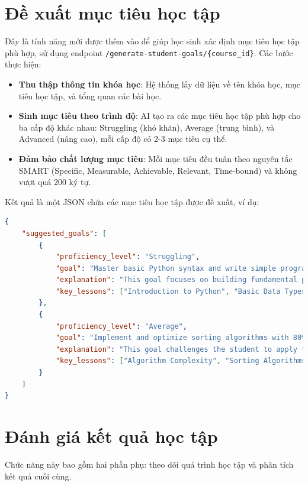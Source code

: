 \section{Đề xuất mục tiêu học tập}
Đây là tính năng mới được thêm vào để giúp học sinh xác định mục tiêu học tập phù hợp, sử dụng endpoint \texttt{/generate-student-goals/\{course\_id\}}. Các bước thực hiện:

\begin{itemize}
    \item \textbf{Thu thập thông tin khóa học}: Hệ thống lấy dữ liệu về tên khóa học, mục tiêu học tập, và tổng quan các bài học.
    \item \textbf{Sinh mục tiêu theo trình độ}: AI tạo ra các mục tiêu học tập phù hợp cho ba cấp độ khác nhau: Struggling (khó khăn), Average (trung bình), và Advanced (nâng cao), mỗi cấp độ có 2-3 mục tiêu cụ thể.
    \item \textbf{Đảm bảo chất lượng mục tiêu}: Mỗi mục tiêu đều tuân theo nguyên tắc SMART (Specific, Measurable, Achievable, Relevant, Time-bound) và không vượt quá 200 ký tự.
\end{itemize}

Kết quả là một JSON chứa các mục tiêu học tập được đề xuất, ví dụ:
\begin{lstlisting}[language=JSON]
{
    "suggested_goals": [
        {
            "proficiency_level": "Struggling",
            "goal": "Master basic Python syntax and write simple programs with 70% accuracy by midterm",
            "explanation": "This goal focuses on building fundamental programming skills...",
            "key_lessons": ["Introduction to Python", "Basic Data Types"]
        },
        {
            "proficiency_level": "Average",
            "goal": "Implement and optimize sorting algorithms with 80% efficiency by midterm",
            "explanation": "This goal challenges the student to apply theoretical concepts...",
            "key_lessons": ["Algorithm Complexity", "Sorting Algorithms"]
        }
    ]
}
\end{lstlisting}

\section{Đánh giá kết quả học tập}
Chức năng này bao gồm hai phần phụ: theo dõi quá trình học tập và phân tích kết quả cuối cùng.


